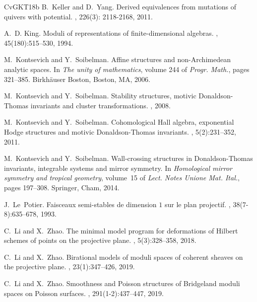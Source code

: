 \documentclass[12pt, a4paper]{amsart}
\begin{document}
\begin{thebibliography}{CvGKT18b}
B.~Keller and D.~Yang.
\newblock Derived equivalences from mutations of quivers with potential.
, 226(3): 2118-2168, 2011.



A.~D. King.
\newblock Moduli of representations of finite-dimensional algebras.
, 45(180):515--530, 1994.


M.~Kontsevich and Y.~Soibelman.
\newblock Affine structures and non-{A}rchimedean analytic spaces.
\newblock In {\em The unity of mathematics}, volume 244 of {\em Progr. Math.},
  pages 321--385. Birkh\"auser Boston, Boston, MA, 2006.

M.~Kontsevich and Y.~Soibelman.
\newblock Stability structures, motivic {D}onaldson-{T}homas invariants and
  cluster transformations.
, 2008.

M.~Kontsevich and Y.~Soibelman.
\newblock Cohomological {H}all algebra, exponential {H}odge structures and
  motivic {D}onaldson-{T}homas invariants.
, 5(2):231--352, 2011.

M.~Kontsevich and Y.~Soibelman.
\newblock Wall-crossing structures in {D}onaldson-{T}homas invariants,
  integrable systems and mirror symmetry.
\newblock In {\em Homological mirror symmetry and tropical geometry}, volume~15
  of {\em Lect. Notes Unione Mat. Ital.}, pages 197--308. Springer, Cham, 2014.

J.~Le~Potier.
\newblock Faisceaux semi-stables de dimension {$1$} sur le plan projectif.
, 38(7-8):635--678, 1993.


C.~Li and X.~Zhao.
\newblock The minimal model program for deformations of {H}ilbert schemes of
  points on the projective plane.
, 5(3):328--358, 2018.

C.~Li and X.~Zhao.
\newblock Birational models of moduli spaces of coherent sheaves on the
  projective plane.
, 23(1):347--426, 2019.

C.~Li and X.~Zhao.
\newblock Smoothness and {P}oisson structures of {B}ridgeland moduli spaces on
  {P}oisson surfaces.
, 291(1-2):437--447, 2019.



\end{thebibliography}
\end{document}
